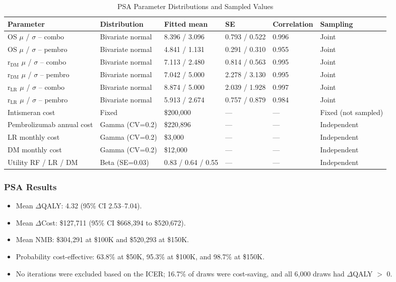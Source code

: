 \documentclass[11pt,a4paper]{article}
\begin{document}
\begin{landscape}
\begin{table}[p]
\centering
\caption{PSA Parameter Distributions and Sampled Values}
\label{tab:s12}
\footnotesize
\setlength{\tabcolsep}{5pt}
\begin{tabularx}{\linewidth}{@{}>{\raggedright\arraybackslash}Xlllll@{}}
\toprule
\textbf{Parameter} & \textbf{Distribution} & \textbf{Fitted mean} & \textbf{SE} & \textbf{Correlation} & \textbf{Sampling} \\
\midrule
OS $\mu$ / $\sigma$ -- combo & Bivariate normal & 8.396 / 3.096 & 0.793 / 0.522 & 0.996 & Joint \\
OS $\mu$ / $\sigma$ -- pembro & Bivariate normal & 4.841 / 1.131 & 0.291 / 0.310 & 0.955 & Joint \\
r$_{\text{DM}}$ $\mu$ / $\sigma$ -- combo & Bivariate normal & 7.113 / 2.480 & 0.814 / 0.563 & 0.995 & Joint \\
r$_{\text{DM}}$ $\mu$ / $\sigma$ -- pembro & Bivariate normal & 7.042 / 5.000 & 2.278 / 3.130 & 0.995 & Joint \\
r$_{\text{LR}}$ $\mu$ / $\sigma$ -- combo & Bivariate normal & 8.874 / 5.000 & 2.039 / 1.928 & 0.997 & Joint \\
r$_{\text{LR}}$ $\mu$ / $\sigma$ -- pembro & Bivariate normal & 5.913 / 2.674 & 0.757 / 0.879 & 0.984 & Joint \\
Intismeran cost & Fixed & \$200,000 & --- & --- & Fixed (not sampled) \\
Pembrolizumab annual cost & Gamma (CV=0.2) & \$220,896 & --- & --- & Independent \\
LR monthly cost & Gamma (CV=0.2) & \$3,000 & --- & --- & Independent \\
DM monthly cost & Gamma (CV=0.2) & \$12,000 & --- & --- & Independent \\
Utility RF / LR / DM & Beta (SE=0.03) & 0.83 / 0.64 / 0.55 & --- & --- & Independent \\
\bottomrule
\end{tabularx}
\end{table}
\end{landscape}

\newpage
\subsubsection{PSA Results}
\begin{itemize}
\item Mean $\Delta$QALY: 4.32 (95\% CI 2.53--7.04).
\item Mean $\Delta$Cost: \$127,711 (95\% CI \textendash\$668,394 to \$520,672).
\item Mean NMB: \$304,291 at \$100K and \$520,293 at \$150K.
\item Probability cost-effective: 63.8\% at \$50K, 95.3\% at \$100K, and 98.7\% at \$150K.
\item No iterations were excluded based on the ICER; 16.7\% of draws were cost-saving, and all 6,000 draws had $\Delta$QALY $>$ 0.
\end{itemize}
\end{document}
